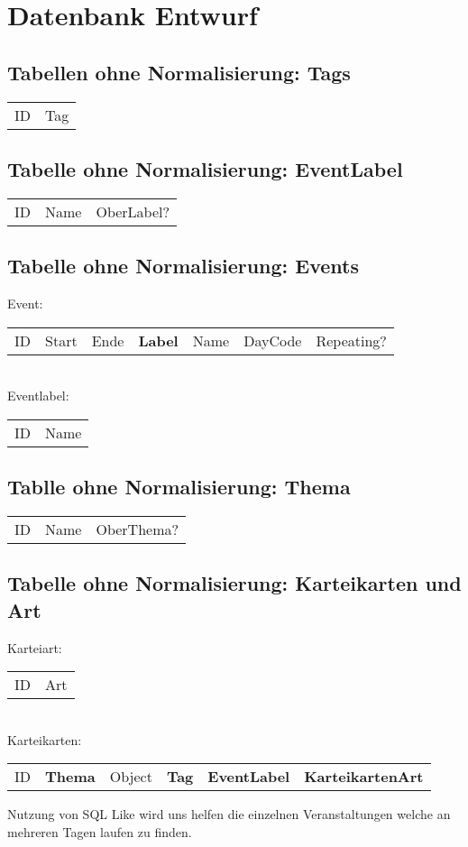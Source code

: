\documentclass[
a4paper,
twoside,
DIV=12,
BCOR=8mm,
headlineinclude=true,
footinclude=false,
numbers=noenddot,
headheight=40pt, 11pt]{scrartcl}
\begin{document}
	\section*{Datenbank Entwurf}
	\subsection[Tags]{Tabellen ohne Normalisierung: Tags}
	\begin{tabular} {|c| c|}
		ID & Tag  \\
	\end{tabular} 
	\subsection[Label]{Tabelle ohne Normalisierung: EventLabel}
	\begin{tabular}{|c| c| c|}
		ID & Name & OberLabel? \\
	\end{tabular}
	\subsection[Events]{Tabelle ohne Normalisierung: Events}
	Event:
	\begin{tabular}{|c| c| c |c |c |c|c|}
		ID & Start & Ende& \textbf{Label}& Name & DayCode & Repeating? 
	\end{tabular}\\ Eventlabel:
	 \begin{tabular}{|c |c|}
	 	ID & Name
	 \end{tabular}
 	\subsection[Thema]{Tablle ohne Normalisierung: Thema}
 	\begin{tabular}{|c| c| c|}
 		ID & Name & OberThema?
 	\end{tabular}
 	\subsection[Karteikarte]{Tabelle ohne Normalisierung: Karteikarten und Art} Karteiart:
 	\begin{tabular}{c |c |}
 		ID & Art
 	\end{tabular} \\ Karteikarten:
 	\begin{tabular}{|c| c| c| c| c| c|}
 		ID & \textbf{Thema} & Object & \textbf{Tag} & \textbf{EventLabel} & \textbf{KarteikartenArt} 
 	\end{tabular}
 \newpage
 Nutzung von SQL Like wird uns helfen die einzelnen Veranstaltungen welche an mehreren Tagen laufen zu finden.
\end{document}
